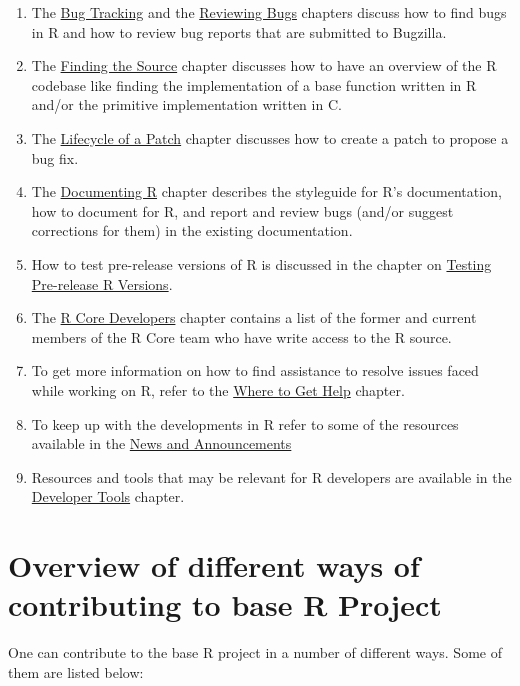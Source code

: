 \documentclass[
]{book}
\begin{document}
\begin{enumerate}
\def\labelenumi{\arabic{enumi}.}
\setcounter{enumi}{1}
\item
  The \protect\hyperlink{BugTrack}{Bug Tracking} and the \protect\hyperlink{ReviewBugs}{Reviewing Bugs} chapters discuss how to find bugs in R and how to review bug reports that are submitted to Bugzilla.
\item
  The \protect\hyperlink{FindSource}{Finding the Source} chapter discusses how to have an overview of the R codebase like finding the implementation of a base function written in R and/or the primitive implementation written in C.
\item
  The \protect\hyperlink{FixBug}{Lifecycle of a Patch} chapter discusses how to create a patch to propose a bug fix.
\item
  The \protect\hyperlink{Doc}{Documenting R} chapter describes the styleguide for R's documentation, how to document for R, and report and review bugs (and/or suggest corrections for them) in the existing documentation.
\item
  How to test pre-release versions of R is discussed in the chapter on \protect\hyperlink{TestRVer}{Testing Pre-release R Versions}.
\item
  The \protect\hyperlink{CoreDev}{R Core Developers} chapter contains a list of the former and current members of the R Core team who have write access to the R source.
\item
  To get more information on how to find assistance to resolve issues faced while working on R, refer to the \protect\hyperlink{WhereToGetHelp}{Where to Get Help} chapter.
\item
  To keep up with the developments in R refer to some of the resources available in the \protect\hyperlink{News}{News and Announcements}
\item
  Resources and tools that may be relevant for R developers are available in the \protect\hyperlink{DevTools}{Developer Tools} chapter.
\end{enumerate}

\hypertarget{overview-of-different-ways-of-contributing-to-base-r-project}{%
\section{Overview of different ways of contributing to base R Project}\label{overview-of-different-ways-of-contributing-to-base-r-project}}

One can contribute to the base R project in a number of different ways. Some of them are listed below:
\end{document}

